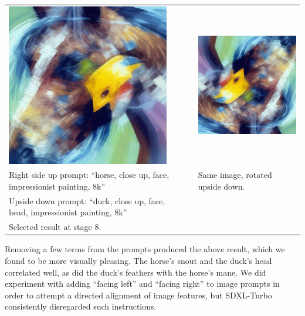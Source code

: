 \documentclass[12pt,letterpaper]{article}
\begin{document}
    \noindent\begin{tabular}{ >{\centering}m{2.9in} m{0.18in} >{\centering\arraybackslash}m{2.9in} }
        \includegraphics[width=2.8in]{img_brown_horse_duck_8.png} & & \includegraphics[width=2.8in]{img_brown_horse_duck_8_rotated.png} \\
        Right side up prompt: ``horse, close up, face, impressionist painting, 8k'' & & Same image, rotated upside down. \\
        Upside down prompt: ``duck, close up, face, head, impressionist painting, 8k'' & & \\
        Selected result at stage 8. & & \\
    \end{tabular}

    Removing a few terms from the prompts produced the above result, which we found to be more visually pleasing. The horse's snout and the duck's head correlated well, as did the duck's feathers with the horse's mane. We did experiment with adding ``facing left'' and ``facing right'' to image prompts in order to attempt a directed alignment of image features, but SDXL-Turbo consistently disregarded such instructions.
\end{document}
